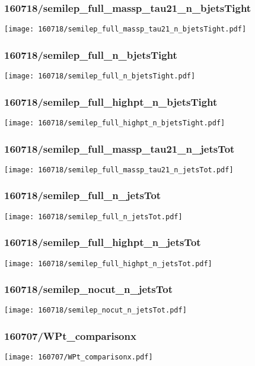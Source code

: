 \begin{frame}
   \frametitle{\small 160718/semilep\_full\_massp\_tau21\_n\_bjetsTight}
   \centering
   \texttt{[image: 160718/semilep\_full\_massp\_tau21\_n\_bjetsTight.pdf]}
\end{frame}

\begin{frame}
   \frametitle{\small 160718/semilep\_full\_n\_bjetsTight}
   \centering
   \texttt{[image: 160718/semilep\_full\_n\_bjetsTight.pdf]}
\end{frame}

\begin{frame}
   \frametitle{\small 160718/semilep\_full\_highpt\_n\_bjetsTight}
   \centering
   \texttt{[image: 160718/semilep\_full\_highpt\_n\_bjetsTight.pdf]}
\end{frame}

\begin{frame}
   \frametitle{\small 160718/semilep\_full\_massp\_tau21\_n\_jetsTot}
   \centering
   \texttt{[image: 160718/semilep\_full\_massp\_tau21\_n\_jetsTot.pdf]}
\end{frame}

\begin{frame}
   \frametitle{\small 160718/semilep\_full\_n\_jetsTot}
   \centering
   \texttt{[image: 160718/semilep\_full\_n\_jetsTot.pdf]}
\end{frame}

\begin{frame}
   \frametitle{\small 160718/semilep\_full\_highpt\_n\_jetsTot}
   \centering
   \texttt{[image: 160718/semilep\_full\_highpt\_n\_jetsTot.pdf]}
\end{frame}

\begin{frame}
   \frametitle{\small 160718/semilep\_nocut\_n\_jetsTot}
   \centering
   \texttt{[image: 160718/semilep\_nocut\_n\_jetsTot.pdf]}
\end{frame}

\begin{frame}
   \frametitle{\small 160707/WPt\_comparisonx}
   \centering
   \texttt{[image: 160707/WPt\_comparisonx.pdf]}
\end{frame}

